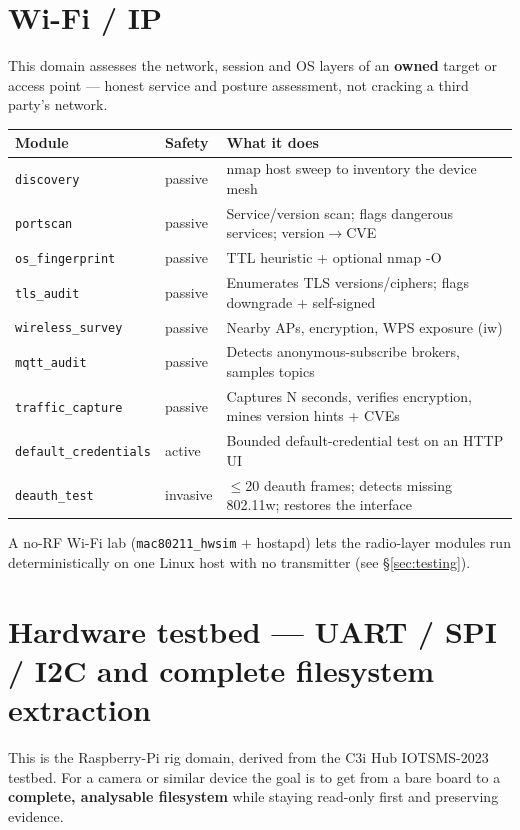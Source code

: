 \documentclass[11pt]{article}
\newif\ifintable\intablefalse
\newcommand{\code}[1]{\ifintable\texttt{#1}\else{\small\colorbox{codebg}{\texttt{#1}}}\fi}
\begin{document}
\section{Wi-Fi / IP}
This domain assesses the network, session and OS layers of an \textbf{owned}
target or access point --- honest service and posture assessment, not cracking a
third party's network.

\begin{table}[h]
\centering\footnotesize\intabletrue
\begin{tabularx}{\textwidth}{@{}L{3.2cm} L{1.8cm} X@{}}
\toprule
\textbf{Module} & \textbf{Safety} & \textbf{What it does}\\
\midrule
\code{discovery} & passive & nmap host sweep to inventory the device mesh\\
\code{portscan} & passive & Service/version scan; flags dangerous services; version$\rightarrow$CVE\\
\code{os\_fingerprint} & passive & TTL heuristic + optional nmap -O\\
\code{tls\_audit} & passive & Enumerates TLS versions/ciphers; flags downgrade + self-signed\\
\code{wireless\_survey} & passive & Nearby APs, encryption, WPS exposure (iw)\\
\code{mqtt\_audit} & passive & Detects anonymous-subscribe brokers, samples topics\\
\code{traffic\_capture} & passive & Captures N seconds, verifies encryption, mines version hints + CVEs\\
\code{default\_credentials} & active & Bounded default-credential test on an HTTP UI\\
\code{deauth\_test} & invasive & $\le$20 deauth frames; detects missing 802.11w; restores the interface\\
\bottomrule
\end{tabularx}
\end{table}

A no-RF Wi-Fi lab (\code{mac80211\_hwsim} + hostapd) lets the radio-layer modules
run deterministically on one Linux host with no transmitter (see \S\ref{sec:testing}).

\section{Hardware testbed --- UART / SPI / I2C and complete filesystem extraction}
This is the Raspberry-Pi rig domain, derived from the C3i Hub IOTSMS-2023
testbed. For a camera or similar device the goal is to get from a bare board to a
\textbf{complete, analysable filesystem} while staying read-only first and
preserving evidence.
\end{document}
